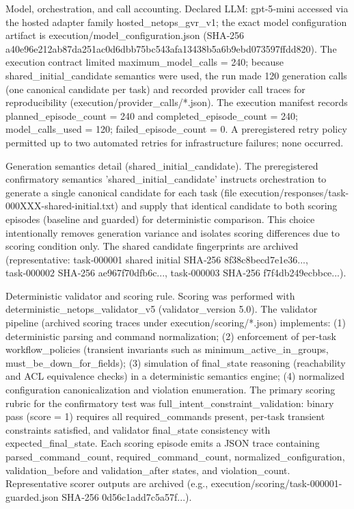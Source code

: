\documentclass[conference]{IEEEtran}
\begin{document}
Model, orchestration, and call accounting. Declared LLM: gpt‑5‑mini accessed via the hosted adapter family hosted\_netops\_gvr\_v1; the exact model configuration artifact is execution/model\_configuration.json (SHA‑256 a40e96e212ab87da251ac0d6dbb75bc543afa13438b5a6b9ebd073597ffdd820). The execution contract limited maximum\_model\_calls = 240; because shared\_initial\_candidate semantics were used, the run made 120 generation calls (one canonical candidate per task) and recorded provider call traces for reproducibility (execution/provider\_calls/*.json). The execution manifest records planned\_episode\_count = 240 and completed\_episode\_count = 240; model\_calls\_used = 120; failed\_episode\_count = 0. A preregistered retry policy permitted up to two automated retries for infrastructure failures; none occurred.

Generation semantics detail (shared\_initial\_candidate). The preregistered confirmatory semantics 'shared\_initial\_candidate' instructs orchestration to generate a single canonical candidate for each task (file execution/responses/task-000XXX-shared-initial.txt) and supply that identical candidate to both scoring episodes (baseline and guarded) for deterministic comparison. This choice intentionally removes generation variance and isolates scoring differences due to scoring condition only. The shared candidate fingerprints are archived (representative: task‑000001 shared initial SHA‑256 8f38c8becd7e1e36..., task‑000002 SHA‑256 ae967f70dfb6c..., task‑000003 SHA‑256 f7f4db249ecbbce...).

Deterministic validator and scoring rule. Scoring was performed with deterministic\_netops\_validator\_v5 (validator\_version 5.0). The validator pipeline (archived scoring traces under execution/scoring/*.json) implements: (1) deterministic parsing and command normalization; (2) enforcement of per‑task workflow\_policies (transient invariants such as minimum\_active\_in\_groups, must\_be\_down\_for\_fields); (3) simulation of final\_state reasoning (reachability and ACL equivalence checks) in a deterministic semantics engine; (4) normalized configuration canonicalization and violation enumeration. The primary scoring rubric for the confirmatory test was full\_intent\_constraint\_validation: binary pass (score = 1) requires all required\_commands present, per‑task transient constraints satisfied, and validator final\_state consistency with expected\_final\_state. Each scoring episode emits a JSON trace containing parsed\_command\_count, required\_command\_count, normalized\_configuration, validation\_before and validation\_after states, and violation\_count. Representative scorer outputs are archived (e.g., execution/scoring/task-000001-guarded.json SHA‑256 0d56c1add7c5a57f...).
\end{document}
